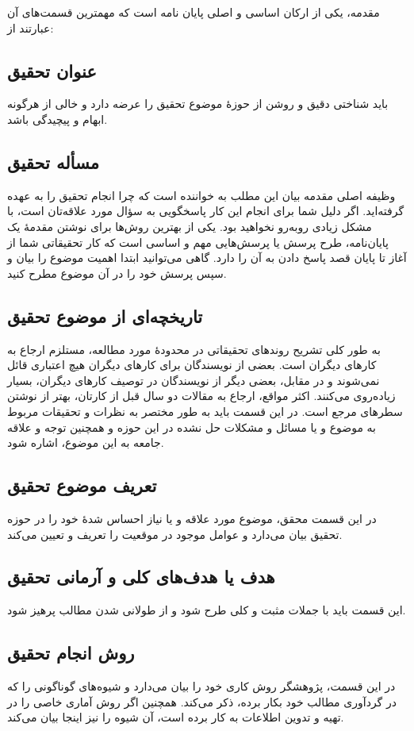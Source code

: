 مقدمه، یکی از ارکان اساسی و اصلی پایان نامه است که مهمترین قسمت‌های آن عبارتند از:

\subsection{عنوان تحقیق}
باید شناختی دقیق و روشن از حوزهٔ موضوع تحقیق را عرضه دارد و خالی از هرگونه ابهام و پیچیدگی باشد.

\subsection{مسأله تحقیق}
وظیفه اصلی مقدمه بیان این مطلب به خواننده است که چرا انجام تحقیق را به عهده گرفته‌اید. اگر دلیل شما برای انجام این کار پاسخگویی به سؤال مورد علاقه‌تان است، با مشکل زیادی روبه‌رو نخواهید بود. یکی از بهترین روش‌ها برای نوشتن مقدمهٔ یک پایان‌نامه، طرح پرسش یا پرسش‌هایی مهم و اساسی است که کار تحقیقاتی شما از آغاز تا پایان قصد پاسخ دادن به آن را دارد. گاهی می‌توانید ابتدا اهمیت موضوع را بیان و سپس پرسش خود را در آن موضوع مطرح کنید.

\subsection{تاریخچه‌ای از موضوع تحقیق}
به طور کلی تشریح روندهای تحقیقاتی در محدودهٔ مورد مطالعه، مستلزم ارجاع به کارهای دیگران است. بعضی از نویسندگان برای کارهای دیگران هیچ اعتباری قائل نمی‌شوند و در مقابل، بعضی دیگر از نویسندگان در توصیف کارهای دیگران، بسیار زیاده‌روی می‌کنند. اکثر مواقع، ارجاع به مقالات دو سال قبل از کارتان، بهتر از نوشتن سطرهای مرجع است. در این قسمت باید به طور مختصر به نظرات و تحقیقات مربوط به موضوع و یا مسائل و مشکلات حل نشده در این حوزه و همچنین توجه و علاقه جامعه به این موضوع، اشاره شود.

\subsection{تعریف موضوع تحقیق}
در این قسمت محقق، موضوع مورد علاقه و یا نیاز احساس شدهٔ خود را در حوزه تحقیق بیان می‌دارد و عوامل موجود در موقعیت را تعریف و تعیین می‌کند.

\subsection{هدف یا هدف‌های کلی و آرمانی تحقیق}
این قسمت باید با جملات مثبت و کلی طرح شود و از طولانی شدن مطالب پرهیز شود.

\subsection{روش انجام تحقیق}
در این قسمت، پژوهشگر روش کاری خود را بیان می‌دارد و شیوه‌های گوناگونی را که در گردآوری مطالب خود بکار برده، ذکر می‌کند. همچنین اگر روش آماری خاصی را در تهیه و تدوین اطلاعات به کار برده است، آن شیوه را نیز اینجا بیان می‌کند.


